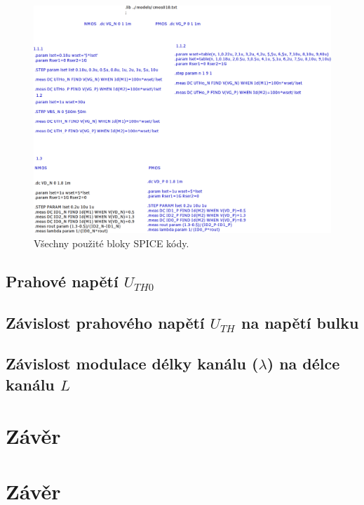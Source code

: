 \documentclass{protokol}
\begin{document}
  \begin{figure}[h!]
    \centering
    \includegraphics[width=\textwidth]{img/spice.png}
    \caption{Všechny použité bloky SPICE kódy.}
    \label{fig:img-spice-png}
  \end{figure}


  \clearpage
\subsection{Prahové napětí \(U_{TH0} \) }

\subsection{Závislost prahového napětí \(U_{TH} \) na napětí bulku}

\subsection{Závislost modulace délky kanálu (\(\lambda\)) na délce kanálu \( L\) }


\section{Závěr}
  \clearpage

\section{Závěr}
  
\clearpage
\end{document}
